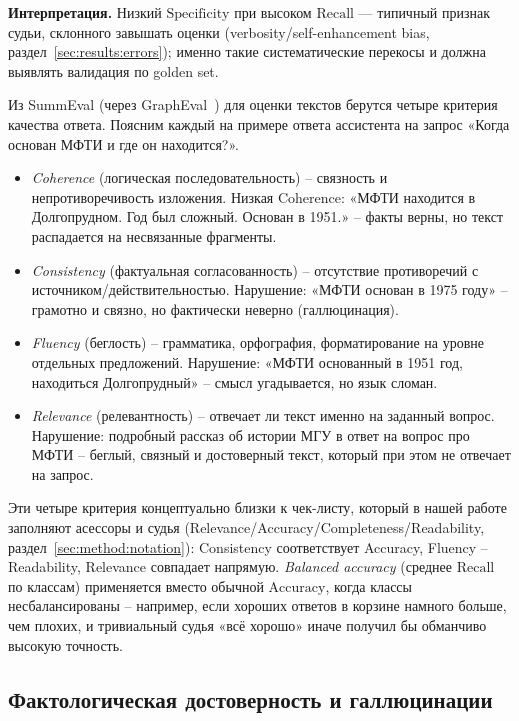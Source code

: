 \textbf{Интерпретация.} Низкий $\mathrm{Specificity}$ при высоком $\mathrm{Recall}$ — типичный признак судьи, склонного завышать оценки (verbosity/self-enhancement bias, раздел~\ref{sec:results:errors}); именно такие систематические перекосы и должна выявлять валидация по golden set.

Из SummEval (через GraphEval~\cite{sansford2024grapheval}) для оценки
текстов берутся четыре критерия качества ответа.
Поясним каждый на примере ответа ассистента на запрос
«Когда основан МФТИ и где он находится?».
\begin{itemize}
    \item \emph{Coherence} (логическая последовательность) -- связность
        и непротиворечивость изложения. Низкая Coherence: «МФТИ
        находится в Долгопрудном. Год был сложный. Основан в 1951.» --
        факты верны, но текст распадается на несвязанные фрагменты.
    \item \emph{Consistency} (фактуальная согласованность) -- отсутствие
        противоречий с источником/действительностью. Нарушение: «МФТИ
        основан в 1975 году» -- грамотно и связно, но фактически
        неверно (галлюцинация).
    \item \emph{Fluency} (беглость) -- грамматика, орфография,
        форматирование на уровне отдельных предложений. Нарушение:
        «МФТИ основанный в 1951 год, находиться Долгопрудный» --
        смысл угадывается, но язык сломан.
    \item \emph{Relevance} (релевантность) -- отвечает ли текст именно
        на заданный вопрос. Нарушение: подробный рассказ об истории
        МГУ в ответ на вопрос про МФТИ -- беглый, связный и
        достоверный текст, который при этом не отвечает на запрос.
\end{itemize}
Эти четыре критерия концептуально близки к чек-листу, который в нашей
работе заполняют асессоры и судья (Relevance/Accuracy/Completeness/Readability,
раздел~\ref{sec:method:notation}): Consistency соответствует Accuracy,
Fluency -- Readability, Relevance совпадает напрямую.
\emph{Balanced accuracy} (среднее $\mathrm{Recall}$ по классам)
применяется вместо обычной $\mathrm{Accuracy}$, когда классы
несбалансированы -- например, если хороших ответов в корзине намного
больше, чем плохих, и тривиальный судья «всё хорошо» иначе получил бы
обманчиво высокую точность.

\subsection{Фактологическая достоверность и галлюцинации}


